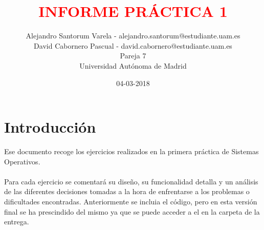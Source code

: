 \documentclass[12pt]{article}
\begin{document}
	\date{04-03-2018}
	
	
	\title{\textbf{\textcolor{red}{INFORME PRÁCTICA 1}}}
	\author{Alejandro Santorum Varela - alejandro.santorum@estudiante.uam.es\\David Cabornero Pascual - david.cabornero@estudiante.uam.es\\Pareja 7\\Universidad Autónoma de Madrid}
	\maketitle
	
	\tableofcontents
	
	\newpage
	
	
\section{Introducción}
Ese documento recoge los ejercicios realizados en la primera práctica de Sistemas Operativos.\\\\
Para cada ejercicio se comentará su diseño, su funcionalidad detalla y un análisis de las diferentes decisiones tomadas a la hora de enfrentarse a los problemas o dificultades encontradas. Anteriormente se incluia el código, pero en esta versión final se ha prescindido del mismo ya que se puede acceder a el en la carpeta de la entrega.\\
\end{document}
